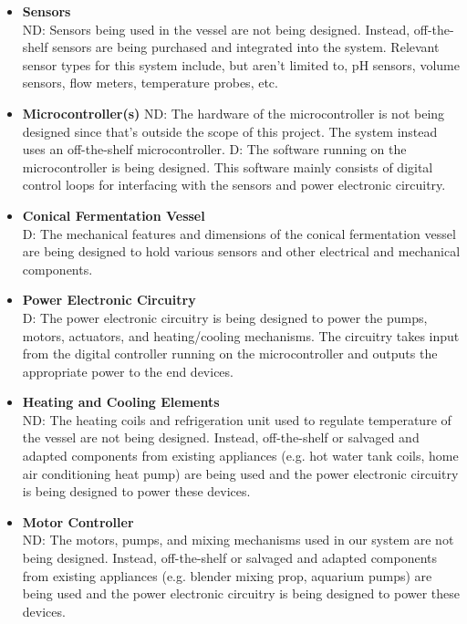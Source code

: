 \documentclass{article}
\begin{document}
\begin{itemize}
\item\textbf{Sensors}
\\ND: Sensors being used in the vessel are not being designed.  Instead, off-the-shelf sensors are being purchased and integrated into the system.  Relevant sensor types for this system include, but aren't limited to, pH sensors, volume sensors, flow meters, temperature probes, etc.

\item\textbf{Microcontroller(s)}
ND: The hardware of the microcontroller is not being designed since that's outside the scope of this project. The system instead uses an off-the-shelf microcontroller.
D: The software running on the microcontroller is being designed. This software mainly consists of digital control loops for interfacing with the sensors and power electronic circuitry.

\item\textbf{Conical Fermentation Vessel}
\\D: The mechanical features and dimensions of the conical fermentation vessel are being designed to hold various sensors and other electrical and mechanical components. 

\item\textbf{Power Electronic Circuitry}
\\D: The power electronic circuitry is being designed to power the pumps, motors, actuators, and heating/cooling mechanisms. The circuitry takes input from the digital controller running on the microcontroller and outputs the appropriate power to the end devices.

\item\textbf{Heating and Cooling Elements}
\\ND: The heating coils and refrigeration unit used to regulate temperature of the vessel are not being designed. Instead, off-the-shelf or salvaged and adapted components from existing appliances (e.g. hot water tank coils, home air conditioning heat pump) are being used and the power electronic circuitry is being designed to power these devices.

\item\textbf{Motor Controller}
\\ND: The motors, pumps, and mixing mechanisms used in our system are not being designed. Instead, off-the-shelf or salvaged and adapted components from existing appliances (e.g. blender mixing prop, aquarium pumps) are being used and the power electronic circuitry is being designed to power these devices.


\end{itemize}
\end{document}
